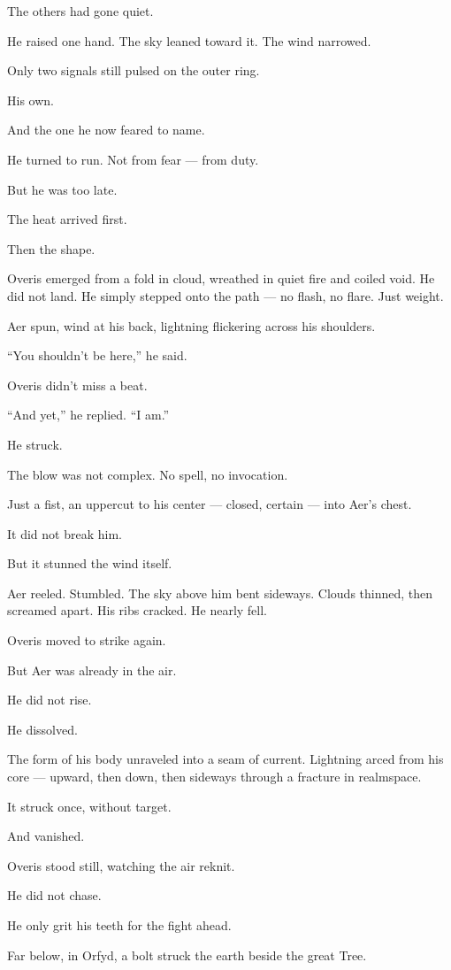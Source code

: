 \documentclass[9pt]{article}
\begin{document}
The others had gone quiet.

He raised one hand. The sky leaned toward it. The wind narrowed.

Only two signals still pulsed on the outer ring.

His own.

And the one he now feared to name.

He turned to run. Not from fear — from duty.

But he was too late.

The heat arrived first.

Then the shape.

Overis emerged from a fold in cloud, wreathed in quiet fire and coiled void. He did not land. He simply stepped onto the path — no flash, no flare. Just weight.

Aer spun, wind at his back, lightning flickering across his shoulders.

``You shouldn’t be here,'' he said.

Overis didn't miss a beat.

``And yet,'' he replied. ``I am.''

He struck.

The blow was not complex. No spell, no invocation.

Just a fist, an uppercut to his center — closed, certain — into Aer’s chest.

It did not break him.

But it stunned the wind itself.

Aer reeled. Stumbled. The sky above him bent sideways. Clouds thinned, then screamed apart. His ribs cracked. He nearly fell.

Overis moved to strike again.

But Aer was already in the air.

He did not rise.

He dissolved.

The form of his body unraveled into a seam of current. Lightning arced from his core — upward, then down, then sideways through a fracture in realmspace.

It struck once, without target.

And vanished.

Overis stood still, watching the air reknit.

He did not chase.

He only grit his teeth for the fight ahead.

Far below, in Orfyd, a bolt struck the earth beside the great Tree.
\end{document}
